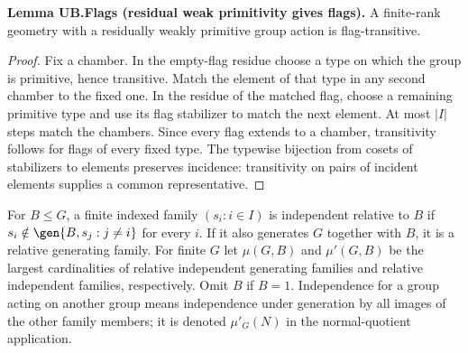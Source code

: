 \noindent\textbf{Lemma UB.Flags (residual weak primitivity gives flags).}
A finite-rank geometry with a residually weakly primitive group action
is flag-transitive.
\begin{proof}
Fix a chamber. In the empty-flag residue choose a type on which the group
is primitive, hence transitive. Match the element of that type in any
second chamber to the fixed one. In the residue of the matched flag,
choose a remaining primitive type and use its flag stabilizer to match
the next element. At most $|I|$ steps match the chambers. Since every
flag extends to a chamber, transitivity follows for flags of every
fixed type. The typewise bijection from cosets of stabilizers to
elements preserves incidence: transitivity on pairs of incident
elements supplies a common representative.
\end{proof}

For $B\leq G$, a finite indexed family $(s_i:i\in I)$ is independent
relative to $B$ if
$s_i\notin\gen{B,s_j:j\ne i}$ for every $i$. If it also generates
$G$ together with $B$, it is a relative generating family. For finite
$G$ let $\mu(G,B)$ and $\mu'(G,B)$ be the largest cardinalities of
relative independent generating families and relative independent
families, respectively. Omit $B$ if $B=1$. Independence for a group
acting on another group means independence under generation by all
images of the other family members; it is denoted $\mu'_G(N)$ in the
normal-quotient application.
